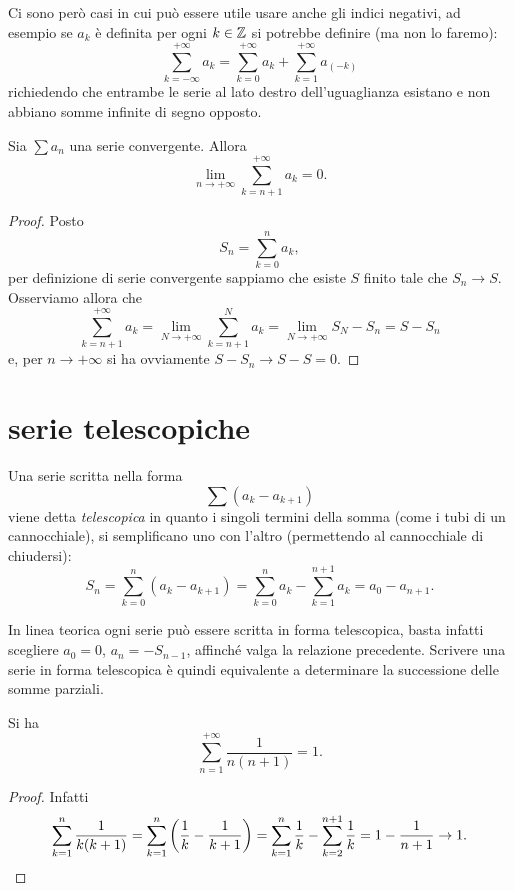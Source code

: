Ci sono però casi in cui può essere utile usare anche gli indici negativi,
ad esempio
se $a_k$ è definita per ogni $k\in {\mathbb Z}$
si potrebbe definire (ma non lo faremo):
\[
  \sum_{k=-\infty}^{+\infty} a_k
  = \sum_{k=0}^{+\infty} a_k +
  \sum_{k=1}^{+\infty} a_{(-k)}
\]
richiedendo che entrambe le serie al lato destro
dell'uguaglianza esistano e non abbiano somme infinite di segno opposto.

\begin{theorem}
\label{th:coda}%
\mymark{*}%
Sia $\sum a_n$ una serie convergente. Allora
\[
  \lim_{n\to +\infty} \sum_{k=n+1}^{+\infty} a_k = 0.
\]
\end{theorem}
%
\begin{proof}
\mymark{*}
Posto
\[
  S_n = \sum_{k=0}^n a_k,
\]
per definizione di serie convergente sappiamo che esiste $S$ finito
tale che $S_n \to S$. Osserviamo allora che
\[
  \sum_{k=n+1}^{+\infty} a_k = \lim_{N\to+\infty} \sum_{k=n+1}^N a_k
   = \lim_{N\to +\infty} S_N - S_n = S - S_n
\]
e, per $n\to +\infty$ si ha ovviamente $S - S_n \to S - S = 0$.
\end{proof}

\section{serie telescopiche}

Una serie scritta nella forma
\[
  \sum (a_{k} - a_{k+1})
\]
viene detta \emph{telescopica}
%
in quanto i singoli termini della somma (come i tubi di un cannocchiale),
si semplificano uno con l'altro (permettendo al cannocchiale di chiudersi):
\[
  S_n = \sum_{k=0}^n (a_{k} - a_{k+1})
  = \sum_{k=0}^{n} a_k - \sum_{k=1}^{n+1} a_k
  = a_0 - a_{n+1}.
\]

In linea teorica ogni serie può essere scritta in forma telescopica, basta infatti scegliere $a_0=0$, $a_n = -S_{n-1}$, affinché valga la relazione precedente. Scrivere una serie in forma telescopica è quindi equivalente a determinare la successione delle somme parziali.

\begin{example}
\mymark{**}
Si ha
\[
  \sum_{n=1}^{+\infty} \frac{1}{n(n+1)} = 1.
\]
\end{example}
%
\begin{proof}
\mymark{**}
Infatti
\[
  \sum_{k=1}^n \frac{1}{k(k+1)}
  = \sum_{k=1}^n {\left( \frac{1}{k} - \frac{1}{k+1} \right)}
  = \sum_{k=1}^n \frac{1}{k} - \sum_{k=2}^{n+1} \frac{1}{k}
  = 1 - \frac{1}{n+1} \to 1.
\]
\end{proof}

